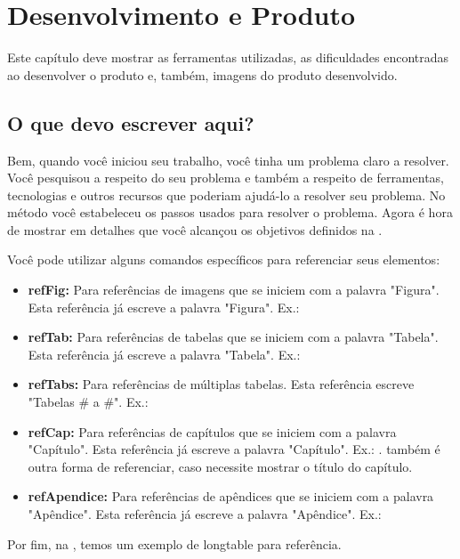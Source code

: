 \chapter{Desenvolvimento e Produto}
\label{Produto}

Este capítulo deve mostrar as ferramentas utilizadas, as dificuldades encontradas ao desenvolver o produto e, também, imagens do produto desenvolvido.

\section{O que devo escrever aqui?}
Bem, quando você iniciou seu trabalho, você tinha um problema claro a resolver.
Você pesquisou a respeito do seu problema e também a respeito de ferramentas, tecnologias e outros recursos que poderiam ajudá-lo a resolver seu problema. No método você estabeleceu os passos usados para resolver o problema. Agora é hora de mostrar em detalhes que você alcançou os objetivos definidos na .

Você pode utilizar alguns comandos específicos para referenciar seus elementos:
\begin{itemize}
    \item \textbf{refFig:} Para referências de imagens que se iniciem com a palavra "Figura". Esta referência já escreve a palavra "Figura". Ex.: 
    \item \textbf{refTab:} Para referências de tabelas que se iniciem com a palavra "Tabela". Esta referência já escreve a palavra "Tabela". Ex.: 
    \item \textbf{refTabs:} Para referências de múltiplas tabelas. Esta referência escreve "Tabelas \# a \#". Ex.: 
    \item \textbf{refCap:} Para referências de capítulos que se iniciem com a palavra "Capítulo". Esta referência já escreve a palavra "Capítulo". Ex.: .  também é outra forma de referenciar, caso necessite mostrar o título do capítulo.
    \item \textbf{refApendice:} Para referências de apêndices que se iniciem com a palavra "Apêndice". Esta referência já escreve a palavra "Apêndice". Ex.: 
\end{itemize}

Por fim, na , temos um exemplo de longtable para referência.

